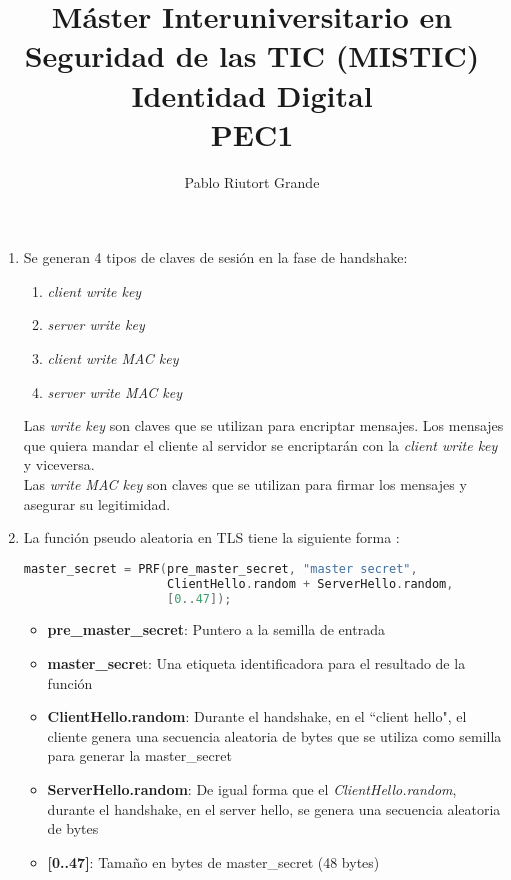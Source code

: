 \documentclass[10pt,a4paper]{article}
\author{Pablo Riutort Grande}
\title{Máster Interuniversitario en Seguridad de las TIC (MISTIC)\\ \vspace{1cm}\textbf{Identidad Digital}\vspace{1cm}\\\textbf{PEC1}}
\begin{document}
\maketitle
\pagebreak

\section{}
\begin{enumerate}[label=\alph*]
\item Se generan 4 tipos de claves de sesión en la fase de handshake:
\begin{enumerate}[label=(\arabic*)]
\item \textit{client write key}
\item \textit{server write key}
\item \textit{client write MAC key}
\item \textit{server write MAC key}
\end{enumerate}
Las \textit{write key} son claves que se utilizan para encriptar mensajes. Los mensajes que quiera mandar el cliente al servidor se encriptarán con la \textit{client write key} y viceversa.\\
Las \textit{write MAC key} son claves que se utilizan para firmar los mensajes y asegurar su legitimidad. \cite{cloudfare}

\item 
La función pseudo aleatoria en TLS tiene la siguiente forma \cite{rfc5246_8.1}:

\begin{lstlisting}[language=C]
master_secret = PRF(pre_master_secret, "master secret",
                    ClientHello.random + ServerHello.random, 
                    [0..47]);
\end{lstlisting}

\begin{itemize}
\item \textbf{pre\_master\_secret}: Puntero a la semilla de entrada
\item \textbf{master\_secre}t: Una etiqueta identificadora para el resultado de la función
\item \textbf{ClientHello.random}: Durante el handshake, en el ``client hello", el cliente genera una secuencia aleatoria de bytes que se utiliza como semilla para generar la master\_secret
\item \textbf{ServerHello.random}: De igual forma que el \textit{ClientHello.random}, durante el handshake, en el server hello, se genera una secuencia aleatoria de bytes
\item \textbf{[0..47]}: Tamaño en bytes de master\_secret (48 bytes)
\cite{cryptosoft}
\end{itemize}


\end{enumerate}
\end{document}
